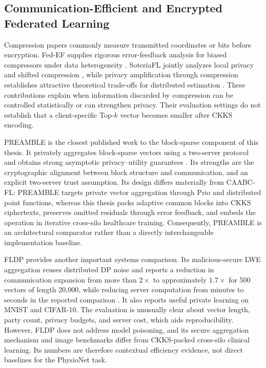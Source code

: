 \subsection{Communication-Efficient and Encrypted Federated Learning}

Compression papers commonly measure transmitted coordinates or bits before encryption. Fed-EF supplies rigorous error-feedback analysis for biased compressors under data heterogeneity \cite{li2023fedef}. SoteriaFL jointly analyzes local privacy and shifted compression \cite{li2022soteriafl}, while privacy amplification through compression establishes attractive theoretical trade-offs for distributed estimation \cite{chen2023privacycompression}. These contributions explain when information discarded by compression can be controlled statistically or can strengthen privacy. Their evaluation settings do not establish that a client-specific Top-$k$ vector becomes smaller after CKKS encoding.

PREAMBLE is the closest published work to the block-sparse component of this thesis. It privately aggregates block-sparse vectors using a two-server protocol and obtains strong asymptotic privacy--utility guarantees \cite{asi2025preamble}. Its strengths are the cryptographic alignment between block structure and communication, and an explicit two-server trust assumption. Its design differs materially from CAABC-FL: PREAMBLE targets private vector aggregation through Prio and distributed point functions, whereas this thesis packs adaptive common blocks into CKKS ciphertexts, preserves omitted residuals through error feedback, and embeds the operation in iterative cross-silo healthcare training. Consequently, PREAMBLE is an architectural comparator rather than a directly interchangeable implementation baseline.

FLDP provides another important systems comparison. Its malicious-secure LWE aggregation reuses distributed DP noise and reports a reduction in communication expansion from more than $2\times$ to approximately $1.7\times$ for 500 vectors of length 20,000, while reducing server computation from minutes to seconds in the reported comparison \cite{stevens2022fldp}. It also reports useful private learning on MNIST and CIFAR-10. The evaluation is unusually clear about vector length, party count, privacy budgets, and server cost, which aids reproducibility. However, FLDP does not address model poisoning, and its secure aggregation mechanism and image benchmarks differ from CKKS-packed cross-silo clinical learning. Its numbers are therefore contextual efficiency evidence, not direct baselines for the PhysioNet task.

